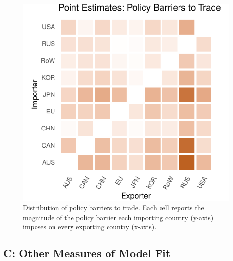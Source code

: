 \documentclass{puthesis}
\begin{document}
\begin{figure}
\centering
\includegraphics{figure/tauhm-1.pdf}
\caption{Distribution of policy barriers to trade. Each cell reports the
magnitude of the policy barrier each importing country (y-axis) imposes
on every exporting country (x-axis). \label{fig:tauhm}}
\end{figure}

\subsection{C: Other Measures of Model Fit}
\end{document}
